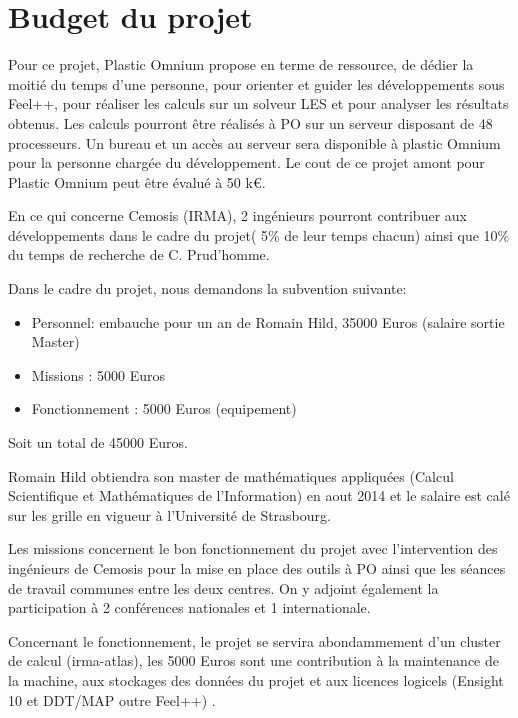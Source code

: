 \documentclass{article}
\begin{document}
\section{Budget du projet}
\label{sec:budget}

Pour ce projet, Plastic Omnium propose en terme de ressource, de dédier la
moitié du temps d’une personne, pour orienter et guider les développements sous
Feel++, pour réaliser les calculs sur un solveur LES et pour analyser les
résultats obtenus. Les calculs pourront être réalisés à PO sur un serveur
disposant de 48 processeurs. Un bureau et un accès au serveur sera disponible à
plastic Omnium pour la personne chargée du développement. Le cout de ce projet
amont pour Plastic Omnium peut être évalué à 50 k€.

En ce qui concerne Cemosis (IRMA), 2 ingénieurs pourront contribuer aux
développements dans le cadre du projet( 5\% de leur temps chacun) ainsi que 10\%
du temps de recherche de C. Prud'homme.

Dans le cadre du projet, nous demandons la subvention suivante:
\begin{itemize}
\item Personnel: embauche pour un an de Romain Hild, 35000 Euros (salaire sortie Master)
\item Missions : 5000 Euros
\item Fonctionnement  : 5000 Euros (equipement)
\end{itemize}
Soit un total de 45000 Euros.

Romain Hild obtiendra son master de mathématiques appliquées (Calcul
Scientifique et Mathématiques de l'Information) en aout 2014 et le salaire est
calé sur les grille en vigueur à l'Université de Strasbourg.

Les missions concernent le bon fonctionnement du projet avec l'intervention des
ingénieurs de Cemosis pour la mise en place des outils à PO ainsi que les
séances de travail communes entre les deux centres. On y adjoint également la
participation à 2 conférences nationales et 1 internationale.

Concernant le fonctionnement, le projet se servira abondammement d'un cluster de
calcul (irma-atlas), les 5000 Euros sont une contribution à la maintenance de la
machine, aux stockages des données du projet et aux licences logicels (Ensight
10 et DDT/MAP outre Feel++) .
\end{document}
